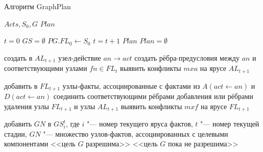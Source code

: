 \documentclass[b5paper,11pt]{book}
\begin{document}
	\begin{algorithm}[h]
		\caption{Алгоритм GraphPlan}\label{alg:graphplan}
		\begin{algorithmic}[1]
			\Require $Acts, S_0, G$
			\Ensure $Plan$
			
			\State $t = 0$ 
			\State $GS = \emptyset$ 
			\State $PG.FL_0 \leftarrow S_0$
				\State {}
				\State {}
				\State $t = t + 1$ 
			\EndWhile
				\State \Return $Plan$
			\Else
				\State \Return $Plan = \emptyset$
			\EndIf
			
				\Statex{}
						\State создать в $AL_{t + 1}$ узел-действие $an\rightarrow act$
						\State создать рёбра-предусловия между $an$ и соответствующими узлами $fn\in FL_t$
					\EndIf
				\EndFor
				\State выявить конфликты $mxa$ на ярусе $AL_{t + 1}$
				
				\Statex{}
					\State добавить в $FL_{t + 1}$ узлы-факты, ассоциированные с фактами из $A(act\leftarrow an)$ и $D(act\leftarrow an)$
					\State соединить соответствующими рёбрами добавления или рёбрами удаления узлы $FL_{t + 1}$ и узлы $AL_{t + 1}$
				\EndFor
				\State выявить конфликты $mxf$ на ярусе $FL_{t + 1}$
			\EndFunction
			
				\Statex{}
					\State добавить $GN$ в $GS_i^t$, где $i$ "--- номер текущего яруса фактов, $t$	"--- номер текущей стадии, $GN$ "--- множество узлов-фактов, ассоциированных	с целевыми компонентами
				\EndIf
					\State \Return <<цель $G$ разрешима>>
				\Else
					\State \Return <<цель $G$ пока не разрешима>>
				\EndIf
			\EndFunction
			
		\end{algorithmic}
	\end{algorithm}
	
\end{document}

